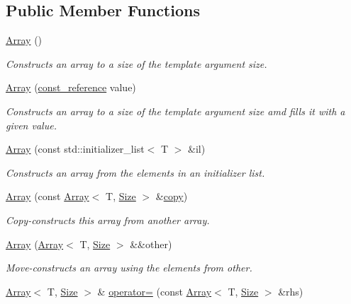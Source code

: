\subsection*{Public Member Functions}
\begin{DoxyCompactItemize}
\item 
\hyperlink{classprism_1_1_array_a606b15825da3f7c1a4ac0e29a38457f9}{Array} ()
\begin{DoxyCompactList}\small\item\em Constructs an array to a size of the template argument {\itshape size}. \end{DoxyCompactList}\item 
\hyperlink{classprism_1_1_array_adfb37348fd7c4fd21ea91e09b8bf127a}{Array} (\hyperlink{classprism_1_1_array_a16161ca6c0027dfa1a7c678e820eedc3}{const\+\_\+reference} value)
\begin{DoxyCompactList}\small\item\em Constructs an array to a size of the template argument {\itshape size} amd fills it with a given value. \end{DoxyCompactList}\item 
\hyperlink{classprism_1_1_array_aeb91bc866a1f21b2b44afc2782d4da0d}{Array} (const std\+::initializer\+\_\+list$<$ T $>$ \&il)
\begin{DoxyCompactList}\small\item\em Constructs an array from the elements in an initializer list. \end{DoxyCompactList}\item 
\hyperlink{classprism_1_1_array_affc1d79efe914a00aad4ac9268ee2584}{Array} (const \hyperlink{classprism_1_1_array}{Array}$<$ T, \hyperlink{classprism_1_1_size}{Size} $>$ \&\hyperlink{namespaceprism_ae776f4cd825f79e7af1cf6ee1d90a209}{copy})
\begin{DoxyCompactList}\small\item\em Copy-\/constructs this array from another array. \end{DoxyCompactList}\item 
\hyperlink{classprism_1_1_array_a94264422464c08b5c328938217ee4af9}{Array} (\hyperlink{classprism_1_1_array}{Array}$<$ T, \hyperlink{classprism_1_1_size}{Size} $>$ \&\&other)
\begin{DoxyCompactList}\small\item\em Move-\/constructs an array using the elements from {\itshape other}. \end{DoxyCompactList}\item 
\hyperlink{classprism_1_1_array}{Array}$<$ T, \hyperlink{classprism_1_1_size}{Size} $>$ \& \hyperlink{classprism_1_1_array_aa1d486886db0159ea668e8abb63a5f84}{operator=} (const \hyperlink{classprism_1_1_array}{Array}$<$ T, \hyperlink{classprism_1_1_size}{Size} $>$ \&rhs)

\end{DoxyCompactItemize}

